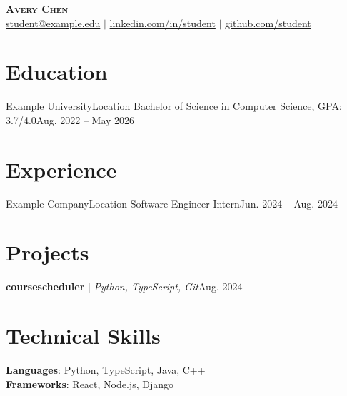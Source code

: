 \documentclass[letterpaper,11pt]{article}
\begin{document}
\begin{center}
    \textbf{\Huge \scshape Avery Chen} \\ \small
    \href{mailto:student@example.edu}{student@example.edu} $|$ 
    \href{https://linkedin.com/in/student}{linkedin.com/in/student} $|$
    \href{https://github.com/student}{github.com/student}
\end{center}

\section{Education}
  \resumeSubHeadingListStart
    \resumeSubheading
      {Example University}{Location}
      {Bachelor of Science in Computer Science, GPA: 3.7/4.0}{Aug. 2022 -- May 2026}
  \resumeSubHeadingListEnd

\section{Experience}
  \resumeSubHeadingListStart
    \resumeSubheading
      {Example Company}{Location}
      {Software Engineer Intern}{Jun. 2024 -- Aug. 2024}
      \resumeItemListStart
      \resumeItemListEnd
  \resumeSubHeadingListEnd

\section{Projects}
  \resumeSubHeadingListStart
    \resumeProjectHeading
      {\textbf{coursescheduler} $|$ \emph{Python, TypeScript, Git}}{Aug. 2024}
      \resumeItemListStart
      \resumeItemListEnd
  \resumeSubHeadingListEnd

\section{Technical Skills}
 \begin{itemize}[leftmargin=0.15in, label={}]
    \small{\item{
     \textbf{Languages}{: Python, TypeScript, Java, C++} \\
     \textbf{Frameworks}{: React, Node.js, Django}
    }}
 \end{itemize}
\end{document}
